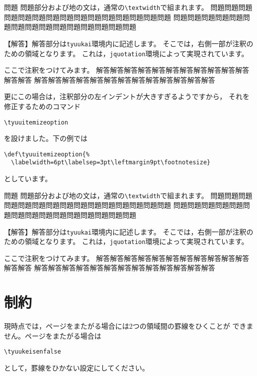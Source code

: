 \documentclass[a4j,fleqn]{jarticle}
\begin{document}
{\renewcommand{\tyuumark}{$\blacktriangleleft$}
\begin{itembox}{問題}
問題部分および地の文は，通常の\verb+\textwidth+で組まれます。
問題問題問題問題問題問題問題問題問題問題問題問題問題問題問題
問題問題問題問題問題問題問題問題問題問題問題問題問題問題問題
\end{itembox}
\begin{tyuukai}
【解答】解答部分は\verb+tyuukai+環境内に記述します。
そこでは，右側一部が注釈のための領域となります。
これは，\verb+jquotation+環境によって実現されています。

ここで注釈をつけてみます。
解答解答解答解答解答解答解答解答解答解答解答解答解答
解答解答解答解答解答解答解答解答解答解答解答解答解答
\end{tyuukai}

更にこの場合は，注釈部分の左インデントが大きすぎるようですから，
それを修正するためのコマンド
\begin{jquote}
\begin{verbatim}
\tyuuitemizeoption
\end{verbatim}
\end{jquote}
を設けました。下の例では
\begin{jquote}
\begin{verbatim}
\def\tyuuitemizeoption{%
  \labelwidth=6pt\labelsep=3pt\leftmargin9pt\footnotesize}
\end{verbatim}
\end{jquote}
としています。

\def\tyuuitemizeoption{%
  \labelwidth=6pt\labelsep=3pt\leftmargin9pt\footnotesize}
\begin{itembox}{問題}
問題部分および地の文は，通常の\verb+\textwidth+で組まれます。
問題問題問題問題問題問題問題問題問題問題問題問題問題問題問題
問題問題問題問題問題問題問題問題問題問題問題問題問題問題問題
\end{itembox}
\begin{tyuukai}
【解答】解答部分は\verb+tyuukai+環境内に記述します。
そこでは，右側一部が注釈のための領域となります。
これは，\verb+jquotation+環境によって実現されています。

ここで注釈をつけてみます。
解答解答解答解答解答解答解答解答解答解答解答解答解答
解答解答解答解答解答解答解答解答解答解答解答解答解答
\end{tyuukai}
}
\clearpage

\section{制約}
現時点では，ページをまたがる場合には2つの領域間の罫線をひくことが
できません。ページをまたがる場合は
\begin{jquote}
\begin{verbatim}
\tyuukeisenfalse
\end{verbatim}
\end{jquote}
として，罫線をひかない設定にしてください。
\end{document}
